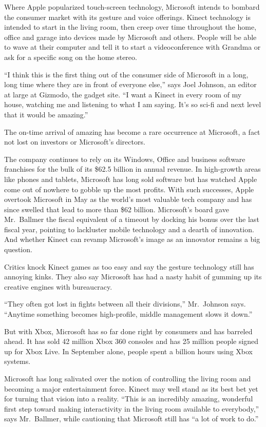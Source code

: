 ﻿\documentclass[12pt]{article}
\begin{document}
Where Apple popularized touch-screen technology, Microsoft intends to bombard the consumer market
with its gesture and voice offerings. Kinect technology is intended to start in the living room,
then creep over time throughout the home, office and garage into devices made by Microsoft and
others. People will be able to wave at their computer and tell it to start a videoconference with
Grandma or ask for a specific song on the home stereo.

``I think this is the first thing out of the consumer side of Microsoft in a long, long time where
they are in front of everyone else,'' says Joel Johnson, an editor at large at Gizmodo, the gadget
site. ``I want a Kinect in every room of my house, watching me and listening to what I am saying.
It's so sci-fi and next level that it would be amazing.''

The on-time arrival of amazing has become a rare occurrence at Microsoft, a fact not lost on
investors or Microsoft's directors.

The company continues to rely on its Windows, Office and business software franchises for the bulk
of its \$62.5 billion in annual revenue. In high-growth areas like phones and tablets, Microsoft has
long sold software but has watched Apple come out of nowhere to gobble up the most profits. With
such successes, Apple overtook Microsoft in May as the world's most valuable tech company and has
since swelled that lead to more than \$62 billion. Microsoft's board gave Mr.~Ballmer the fiscal
equivalent of a timeout by docking his bonus over the last fiscal year, pointing to lackluster
mobile technology and a dearth of innovation. And whether Kinect can revamp Microsoft's image as an
innovator remains a big question.

Critics knock Kinect games as too easy and say the gesture technology still has annoying kinks. They
also say Microsoft has had a nasty habit of gumming up its creative engines with bureaucracy.

``They often got lost in fights between all their divisions,'' Mr.~Johnson says. ``Anytime something
becomes high-profile, middle management slows it down.''

But with Xbox, Microsoft has so far done right by consumers and has barreled ahead. It has sold 42
million Xbox 360 consoles and has 25 million people signed up for Xbox Live. In September alone,
people spent a billion hours using Xbox systems.

Microsoft has long salivated over the notion of controlling the living room and becoming a major
entertainment force. Kinect may well stand as its best bet yet for turning that vision into a
reality. ``This is an incredibly amazing, wonderful first step toward making interactivity in the
living room available to everybody,'' says Mr.~Ballmer, while cautioning that Microsoft still has
``a lot of work to do.''
\end{document}
